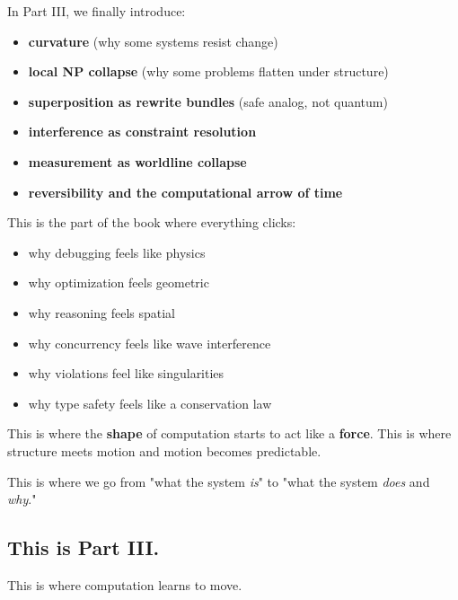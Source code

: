 In Part III, we finally introduce:

\begin{itemize}
\tightlist
\item
  \textbf{curvature} (why some systems resist change)
\item
  \textbf{local NP collapse} (why some problems flatten under structure)
\item
  \textbf{superposition as rewrite bundles} (safe analog, not quantum)
\item
  \textbf{interference as constraint resolution}
\item
  \textbf{measurement as worldline collapse}
\item
  \textbf{reversibility and the computational arrow of time}
\end{itemize}

This is the part of the book where everything clicks:

\begin{itemize}
\tightlist
\item
  why debugging feels like physics\\
\item
  why optimization feels geometric
\item
  why reasoning feels spatial
\item
  why concurrency feels like wave interference
\item
  why violations feel like singularities
\item
  why type safety feels like a conservation law
\end{itemize}

This is where the \textbf{shape} of computation starts to act like a
\textbf{force}. This is where structure meets motion and motion becomes
predictable.

This is where we go from "what the system \emph{is}" to "what the
system \emph{does} and \emph{why}."

\subsection{This is Part III.}\label{this-is-part-iii.}

This is where computation learns to move.
